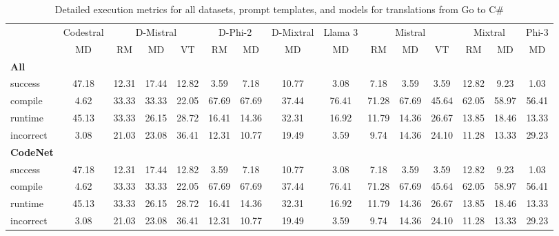 \begin{table}[t]
\caption{Detailed execution metrics for all datasets, prompt templates, and models for translations from Go to C\#}
\label{tab:iteration_1_stats_percent_Go_Csharp}

\setlength{\tabcolsep}{2.5pt} %
\renewcommand{\arraystretch}{1} %

\footnotesize
\begin{tabular}{@{}lcccccccccccccc@{}}
\toprule
 & Codestral & \multicolumn{3}{c}{D-Mistral} & \multicolumn{2}{c}{D-Phi-2} & D-Mixtral & Llama 3 & \multicolumn{3}{c}{Mistral}  & \multicolumn{2}{c}{Mixtral} & Phi-3 \\ 

\cmidrule(l){2-2}
\cmidrule(l){3-5}
\cmidrule(l){6-7}
\cmidrule(l){8-8}
\cmidrule(l){9-9}
\cmidrule(l){10-12}
\cmidrule(l){13-14}
\cmidrule(l){15-15}

& \multicolumn{1}{c}{MD}
& \multicolumn{1}{c}{RM}
& \multicolumn{1}{c}{MD}
& \multicolumn{1}{c}{VT}
& \multicolumn{1}{c}{RM}
& \multicolumn{1}{c}{MD} 
& \multicolumn{1}{c}{MD} 
& \multicolumn{1}{c}{MD} 
& \multicolumn{1}{c}{RM} 
& \multicolumn{1}{c}{MD} 
& \multicolumn{1}{c}{VT} 
& \multicolumn{1}{c}{RM}
& \multicolumn{1}{c}{MD} 
& \multicolumn{1}{c}{MD} \\

\midrule
\textbf{All} & & & & & & & & & & & & & & \\ 
\quad success & 47.18 & 12.31 & 17.44 & 12.82 & 3.59 & 7.18 & 10.77 & 3.08 & 7.18 & 3.59 & 3.59 & 12.82 & 9.23 & 1.03 \\
\qquad compile & 4.62 & 33.33 & 33.33 & 22.05 & 67.69 & 67.69 & 37.44 & 76.41 & 71.28 & 67.69 & 45.64 & 62.05 & 58.97 & 56.41 \\
\qquad runtime & 45.13 & 33.33 & 26.15 & 28.72 & 16.41 & 14.36 & 32.31 & 16.92 & 11.79 & 14.36 & 26.67 & 13.85 & 18.46 & 13.33 \\
\qquad incorrect & 3.08 & 21.03 & 23.08 & 36.41 & 12.31 & 10.77 & 19.49 & 3.59 & 9.74 & 14.36 & 24.10 & 11.28 & 13.33 & 29.23 \\
 

\textbf{CodeNet} & & & & & & & & & & & & & & \\ 
\quad success & 47.18 & 12.31 & 17.44 & 12.82 & 3.59 & 7.18 & 10.77 & 3.08 & 7.18 & 3.59 & 3.59 & 12.82 & 9.23 & 1.03 \\
\qquad compile & 4.62 & 33.33 & 33.33 & 22.05 & 67.69 & 67.69 & 37.44 & 76.41 & 71.28 & 67.69 & 45.64 & 62.05 & 58.97 & 56.41 \\
\qquad runtime & 45.13 & 33.33 & 26.15 & 28.72 & 16.41 & 14.36 & 32.31 & 16.92 & 11.79 & 14.36 & 26.67 & 13.85 & 18.46 & 13.33 \\
\qquad incorrect & 3.08 & 21.03 & 23.08 & 36.41 & 12.31 & 10.77 & 19.49 & 3.59 & 9.74 & 14.36 & 24.10 & 11.28 & 13.33 & 29.23 \\
 

\bottomrule
\end{tabular}
\end{table}





